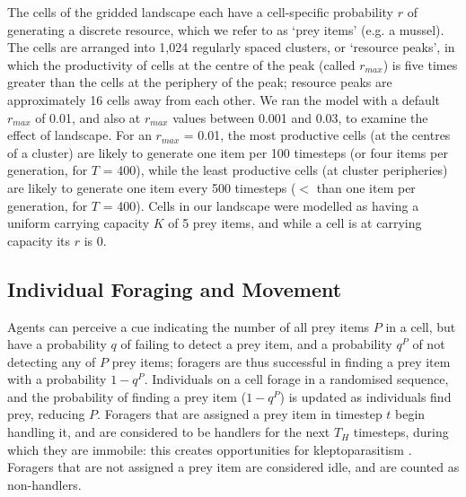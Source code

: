 The cells of the gridded landscape each have a cell-specific probability $r$ of generating a discrete resource, which we refer to as `prey items' (e.g. a mussel).
The cells are arranged into 1,024 regularly spaced clusters, or `resource peaks', in which the productivity of cells at the centre of the peak (called $r_{max}$) is five times greater than the cells at the periphery of the peak; resource peaks are approximately 16 cells away from each other.
We ran the model with a default $r_{max}$ of 0.01, and also at $r_{max}$ values between 0.001 and 0.03, to examine the effect of landscape.
For an $r_{max}$ = 0.01, the most productive cells (at the centres of a cluster) are likely to generate one item per 100 timesteps (or four items per generation, for $T$ = 400), while the least productive cells (at cluster peripheries) are likely to generate one item every 500 timesteps ($<$ than one item per generation, for $T$ = 400).
Cells in our landscape were modelled as having a uniform carrying capacity $K$ of 5 prey items, and while a cell is at carrying capacity its $r$ is 0.

\subsection*{Individual Foraging and Movement}

Agents can perceive a cue indicating the number of all prey items $P$ in a cell, but have a probability $q$ of failing to detect a prey item, and a probability $q^P$ of not detecting any of $P$ prey items; foragers are thus successful in finding a prey item with a probability $1 - q^P$.
Individuals on a cell forage in a randomised sequence, and the probability of finding a prey item ($1 - q^P$) is updated as individuals find prey, reducing $P$.
Foragers that are assigned a prey item in timestep $t$ begin handling it, and are considered to be handlers for the next $T_H$ timesteps, during which they are immobile: this creates opportunities for kleptoparasitism \citep{holmgren1995}.
Foragers that are not assigned a prey item are considered idle, and are counted as non-handlers.

